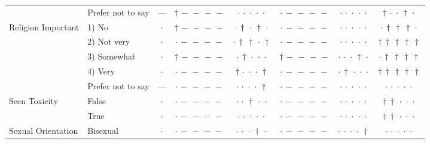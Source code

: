 {\begin{longtable}[t]{llcccccc}
 & Prefer not to say & --- & ${\dagger}\,{-}\,{-}\,{-}\,{-}$ & ${\cdot}\,{\cdot}\,{\cdot}\,{\cdot}\,{\cdot}$ & ${\cdot}\,{-}\,{-}\,{-}\,{-}$ & ${\cdot}\,{\cdot}\,{\cdot}\,{\cdot}\,{\cdot}$ & ${\dagger}\,{\cdot}\,{\cdot}\,{\dagger}\,{\cdot}$ \\
\cline{1-8}
\multirow[t]{5}{*}{Religion Important} & 1) No & $\cdot$ & ${\dagger}\,{-}\,{-}\,{-}\,{-}$ & ${\cdot}\,{\dagger}\,{\cdot}\,{\dagger}\,{\cdot}$ & ${\cdot}\,{-}\,{-}\,{-}\,{-}$ & ${\cdot}\,{\cdot}\,{\cdot}\,{\cdot}\,{\cdot}$ & ${\cdot}\,{\dagger}\,{\dagger}\,{\dagger}\,{\cdot}$ \\
 & 2) Not very & $\cdot$ & ${\cdot}\,{-}\,{-}\,{-}\,{-}$ & ${\cdot}\,{\dagger}\,{\dagger}\,{\cdot}\,{\dagger}$ & ${\cdot}\,{-}\,{-}\,{-}\,{-}$ & ${\cdot}\,{\cdot}\,{\cdot}\,{\cdot}\,{\cdot}$ & ${\dagger}\,{\dagger}\,{\dagger}\,{\dagger}\,{\dagger}$ \\
 & 3) Somewhat & $\cdot$ & ${\dagger}\,{-}\,{-}\,{-}\,{-}$ & ${\cdot}\,{\dagger}\,{\cdot}\,{\cdot}\,{\cdot}$ & ${\dagger}\,{-}\,{-}\,{-}\,{-}$ & ${\cdot}\,{\cdot}\,{\cdot}\,{\dagger}\,{\cdot}$ & ${\cdot}\,{\dagger}\,{\dagger}\,{\dagger}\,{\dagger}$ \\
 & 4) Very & $\cdot$ & ${\cdot}\,{-}\,{-}\,{-}\,{-}$ & ${\dagger}\,{\cdot}\,{\cdot}\,{\cdot}\,{\dagger}$ & ${\cdot}\,{-}\,{-}\,{-}\,{-}$ & ${\cdot}\,{\dagger}\,{\cdot}\,{\cdot}\,{\cdot}$ & ${\dagger}\,{\dagger}\,{\dagger}\,{\dagger}\,{\dagger}$ \\
 & Prefer not to say & --- & ${\cdot}\,{-}\,{-}\,{-}\,{-}$ & ${\cdot}\,{\cdot}\,{\cdot}\,{\cdot}\,{\dagger}$ & ${\cdot}\,{-}\,{-}\,{-}\,{-}$ & ${\cdot}\,{\cdot}\,{\cdot}\,{\cdot}\,{\cdot}$ & ${\cdot}\,{\cdot}\,{\cdot}\,{\cdot}\,{\cdot}$ \\
\cline{1-8}
\multirow[t]{2}{*}{Seen Toxicity} & False & $\cdot$ & ${\cdot}\,{-}\,{-}\,{-}\,{-}$ & ${\cdot}\,{\cdot}\,{\dagger}\,{\cdot}\,{\cdot}$ & ${\cdot}\,{-}\,{-}\,{-}\,{-}$ & ${\cdot}\,{\cdot}\,{\cdot}\,{\cdot}\,{\cdot}$ & ${\dagger}\,{\dagger}\,{\cdot}\,{\cdot}\,{\cdot}$ \\
 & True & $\cdot$ & ${\cdot}\,{-}\,{-}\,{-}\,{-}$ & ${\cdot}\,{\cdot}\,{\cdot}\,{\cdot}\,{\cdot}$ & ${\cdot}\,{-}\,{-}\,{-}\,{-}$ & ${\cdot}\,{\cdot}\,{\cdot}\,{\cdot}\,{\cdot}$ & ${\dagger}\,{\dagger}\,{\cdot}\,{\cdot}\,{\cdot}$ \\
\cline{1-8}
\multirow[t]{5}{*}{Sexual Orientation} & Bisexual & $\cdot$ & ${\cdot}\,{-}\,{-}\,{-}\,{-}$ & ${\cdot}\,{\cdot}\,{\cdot}\,{\dagger}\,{\cdot}$ & ${\cdot}\,{-}\,{-}\,{-}\,{-}$ & ${\cdot}\,{\cdot}\,{\cdot}\,{\cdot}\,{\dagger}$ & ${\cdot}\,{\cdot}\,{\cdot}\,{\cdot}\,{\cdot}$ \\

\end{longtable}}
